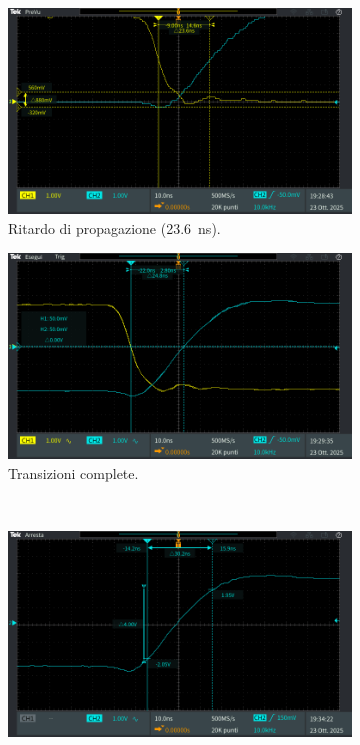 \documentclass[a4paper,12pt]{article}
\begin{document}
\begin{figure}[h]
	\centering
	\begin{subfigure}[b]{0.48\textwidth}
		\centering
		\includegraphics[width=\linewidth]{immagini/inverter/TEK00100.PNG}
		\caption{Ritardo di propagazione (\SI{23.6}{\nano\second}).}
		\label{fig:ritardo_propagazione}
	\end{subfigure}
	\hfill
	\begin{subfigure}[b]{0.48\textwidth}
		\centering
		\includegraphics[width=\linewidth]{immagini/inverter/TEK00101.PNG}
		\caption{Transizioni complete.}
		\label{fig:transizioni_complete}
	\end{subfigure}
	\\[1em]
	\begin{subfigure}[b]{0.48\textwidth}
		\centering
		\includegraphics[width=\linewidth]{immagini/inverter/TEK00102.PNG}

\end{subfigure}
\end{figure}
\end{document}

